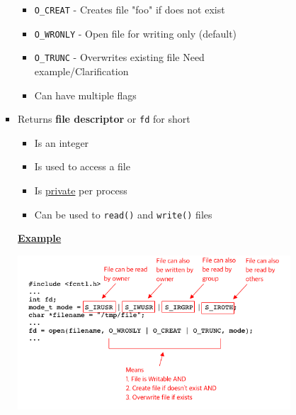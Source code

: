 \documentclass[12pt]{article}
\begin{document}
\begin{enumerate}[1.]
\begin{enumerate}
\begin{itemize}
\begin{itemize}
\begin{itemize}
                    \begin{itemize}
                        \item \texttt{O\_CREAT} - Creates file "foo" if does not exist
                        \item \texttt{O\_WRONLY} - Open file for writing only (default)
                        \item \texttt{O\_TRUNC} - Overwrites existing file \color{red}Need example/Clarification\color{black}
                        \item Can have multiple flags
                    \end{itemize}
                    \item Returns \textbf{file descriptor} or \texttt{fd} for short

                    \begin{itemize}
                        \item Is an integer
                        \item Is used to access a file
                        \item Is \underline{private} per process
                        \item Can be used to \texttt{read()} and \texttt{write()} files
                    \end{itemize}

                    \bigskip

                    \underline{\textbf{Example}}

                    \bigskip

                    \begin{center}
                    \includegraphics[width=\linewidth]{../images/midterm_4_solution_2.png}
                    \end{center}


\end{itemize}
\end{itemize}
\end{itemize}
\end{enumerate}
\end{enumerate}
\end{document}
